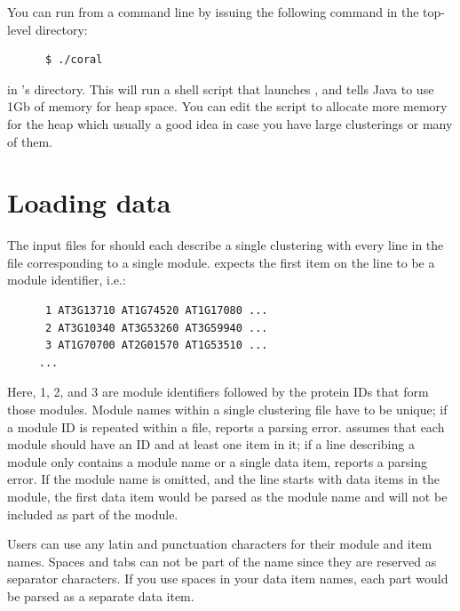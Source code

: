 You can run \coral from a command line by issuing the following command in the 
top-level \coral directory:
%
\begin{verbatim}
      $ ./coral
\end{verbatim}
%
in \coral's directory. This will run a shell script that launches \coral, and
tells Java to use 1Gb of memory for heap space. You can edit the script to 
allocate more memory for the heap which usually a good idea in case you have 
large clusterings or many of them. 




\section{Loading data}

The input files for \coral should each describe a single clustering with every 
line in the file corresponding to a single module. \coral expects the first item
on the line to be a module identifier, i.e.:
%
\begin{verbatim}
      1 AT3G13710 AT1G74520 AT1G17080 ...
      2 AT3G10340 AT3G53260 AT3G59940 ...
      3 AT1G70700 AT2G01570 AT1G53510 ...
     ...
\end{verbatim}
%
Here, 1, 2, and 3 are module identifiers followed by the protein IDs that form
those modules. Module names within a single clustering file have to be unique; 
if a module ID is repeated within a file, \coral reports a parsing error. \coral
assumes that each module should have an ID and at least one item in it; if a 
line describing a module only contains a module name or a single data item, 
\coral reports a parsing error. If the module name is omitted, and the line 
starts with data items in the module, the first data item would be parsed as the 
module name and will not be included as part of the module.

Users can use any latin and punctuation characters for their module and item 
names. Spaces and tabs can not be part of the name since they are reserved as 
separator characters. If you use spaces in your data item names, each part would
be parsed as a separate data item.

